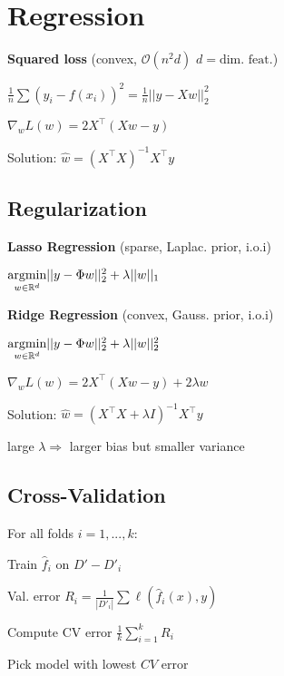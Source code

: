 \section*{Regression}

\textbf{Squared loss} (convex, $\mathcal{O}(n^2d)$ $d = \text{dim. feat.}$)

\qquad \qquad $\frac{1}{n}\sum (y_i - f(x_i))^2 = \frac{1}{n}||y - X w||_2^2$

\qquad \qquad $\nabla_w L(w) = 2X^\top(Xw -y)$

Solution: $\hat{w} = (X^\top X)^{-1}X^\top y$

\subsection*{Regularization}

\textbf{Lasso Regression} (sparse, Laplac. prior, i.o.i)

\qquad \qquad $\underset{w \in \mathbb{R}^d}{\text{argmin}} ||y - \Phi w||_2^2 + \lambda ||w||_1$

\textbf{Ridge Regression} (convex, Gauss. prior, i.o.i)

\qquad \qquad $\underset{w \in \mathbb{R}^d}{\text{argmin}} ||y - \Phi w||_2^2 + \lambda ||w||_2^2$

\qquad \qquad $\nabla_w L(w) = 2X^\top(Xw -y) + 2 \lambda w$

Solution: $\hat w = (X^\top X + \lambda I)^{-1} X^\top y$

large $\lambda \Rightarrow$ larger bias but smaller variance 

\subsection*{Cross-Validation}

\begin{compactitem}
	\item For all folds $i = 1,..., k$: 
		\begin{compactitem}
			\item Train $\hat{f}_i$ on $D' - D'_i$
			\item Val. error $R_i = \frac{1}{|D'_i|} \sum \ell(\hat{f}_i(x), y)$
		\end{compactitem}
	\item Compute CV error $\frac{1}{k} \sum_{i=1}^k R_i$
	\item Pick model with lowest $CV$ error
\end{compactitem}